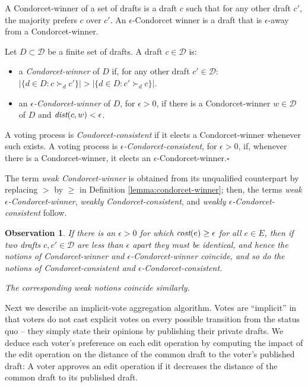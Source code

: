 \documentclass{llncs}
\newtheorem{observation}{Observation}
\newcommand{\qqed}{\hfill$\square$}
\newcommand{\calD}{\mathcal{D}}
\newcommand{\prefers}[1]{\succ_{#1}}
\newcommand{\dist}{\emph{dist}}
\newcommand{\cost}{\emph{cost}}
\begin{document}
A Condorcet-winner of a set of drafts is a draft $c$ such that for any other draft $c'$, the majority prefers $c$ over $c'$.  An $\epsilon$-Condorcet winner is a draft that is $\epsilon$-away from a Condorcet-winner.

\begin{definition}\label{lemma:condorcet-winner}
%
Let $D \subset \calD$ be a finite set of drafts. A draft $c \in \calD$ is:
%
\begin{itemize}

\item
a \emph{Condorcet-winner} of $D$ if, for any other draft $c' \in \calD$: \\ $|\{ d \in D : c \prefers{d} c' \}| > |\{ d \in D : c' \prefers{d} c \}|$.

\item
an \emph{$\epsilon$-Condorcet-winner} of $D$, for $\epsilon > 0$, if there is a Condorcet-winner $w \in \calD$ of $D$ and $\dist(c,w) < \epsilon$.

\end{itemize}
%
A voting process is \emph{Condorcet-consistent} if it elects a Condorcet-winner whenever such exists.
A voting process is \emph{$\epsilon$-Condorcet-consistent}, for $\epsilon > 0$, if, whenever there is a Condorcet-winner, it elects an $\epsilon$-Condorcet-winner.\qqed 
\end{definition}

The term \emph{weak Condorcet-winner} is obtained from its unqualified counterpart by replacing $>$ by $\ge$ in Definition \ref{lemma:condorcet-winner}; then, the terms \emph{weak $\epsilon$-Condorcet-winner}, \emph{weakly Condorcet-consistent}, and \emph{weakly $\epsilon$-Condorcet-consistent} follow.

\begin{observation}\label{observation:coincides}
%
If there is an $\epsilon >0$ for which $\cost(e) \ge \epsilon$ for all $e \in E$, then if two drafts $c, c' \in \calD$ are less than  $\epsilon$ apart they must be identical, and hence the notions of Condorcet-winner and $\epsilon$-Condorcet-winner coincide, and so do the notions of Condorcet-consistent and $\epsilon$-Condorcet-consistent.
 
The corresponding weak notions coincide similarly.
%
\end{observation}

Next we describe an implicit-vote aggregation algorithm. Votes are ``implicit'' in that voters do not cast explicit votes on every possible transition from the status quo -- they simply state their opinions by publishing their private drafts.  We deduce each voter's preference on each edit operation by computing the impact of the edit operation on the distance of the common draft to the voter's published draft: A voter approves an edit operation if it decreases the distance of the common draft to its published draft.
\end{document}
